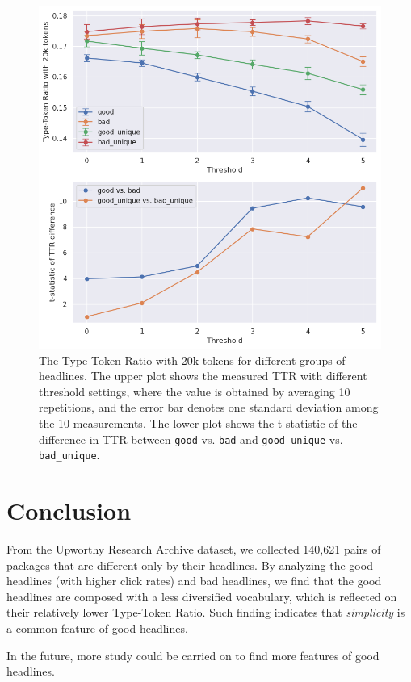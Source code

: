 \documentclass[%
preprint,
 amsmath,amssymb,
 aps,
]{revtex4-2}
\begin{document}
\begin{figure}
    \centering
    \includegraphics[width=0.8\linewidth]{fig/ttr3_error_plot.png}
    \caption{The Type-Token Ratio with 20k tokens for different groups of headlines. The upper plot shows the measured TTR with different threshold settings, where the value is obtained by averaging 10 repetitions, and the error bar denotes one standard deviation among the 10 measurements. The lower plot shows the t-statistic of the difference in TTR between \texttt{good} vs. \texttt{bad} and \texttt{good\_unique} vs. \texttt{bad\_unique}.}
    \label{fig:ttr3_error_plot}
\end{figure}


\section{Conclusion}

From the Upworthy Research Archive dataset, we collected 140,621 pairs of packages that are different only by their headlines.
By analyzing the good headlines (with higher click rates) and bad headlines, we find that the good headlines are composed with a less diversified vocabulary, which is reflected on their relatively lower Type-Token Ratio.
Such finding indicates that \textit{simplicity} is a common feature of good headlines.

In the future, more study could be carried on to find more features of good headlines.

\end{document}
